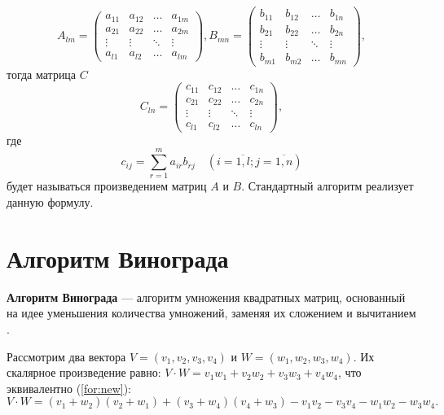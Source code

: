\begin{equation}
	A_{lm} = \begin{pmatrix}
		a_{11} & a_{12} & \ldots & a_{1m}\\
		a_{21} & a_{22} & \ldots & a_{2m}\\
		\vdots & \vdots & \ddots & \vdots\\
		a_{l1} & a_{l2} & \ldots & a_{lm}
	\end{pmatrix},
	B_{mn} = \begin{pmatrix}
		b_{11} & b_{12} & \ldots & b_{1n}\\
		b_{21} & b_{22} & \ldots & b_{2n}\\
		\vdots & \vdots & \ddots & \vdots\\
		b_{m1} & b_{m2} & \ldots & b_{mn}
	\end{pmatrix},
\end{equation}
тогда матрица $C$
\begin{equation}
	C_{ln} = \begin{pmatrix}
		c_{11} & c_{12} & \ldots & c_{1n}\\
		c_{21} & c_{22} & \ldots & c_{2n}\\
		\vdots & \vdots & \ddots & \vdots\\
		c_{l1} & c_{l2} & \ldots & c_{ln}
	\end{pmatrix},
\end{equation}
где
\begin{equation}
	\label{eq:M}
	c_{ij} =
	\sum_{r=1}^{m} a_{ir}b_{rj} \quad (i=\overline{1,l}; j=\overline{1,n})
\end{equation}
будет называться произведением матриц $A$ и $B$.
Стандартный алгоритм реализует данную формулу.


\section{Алгоритм Винограда}

\textbf{Алгоритм Винограда} — алгоритм умножения квадратных матриц, основанный на идее уменьшения количества умножений, заменяя их сложением и вычитанием \cite{vinograd-matrix}.

Рассмотрим два вектора $V = (v_1, v_2, v_3, v_4)$ и $W = (w_1, w_2, w_3, w_4)$.
Их скалярное произведение равно: $V \cdot W = v_1w_1 + v_2w_2 + v_3w_3 + v_4w_4$, что эквивалентно (\ref{for:new}):
\begin{equation}
	\label{for:new}
	V \cdot W = (v_1 + w_2)(v_2 + w_1) + (v_3 + w_4)(v_4 + w_3) - v_1v_2 - v_3v_4 - w_1w_2 - w_3w_4.
\end{equation}


